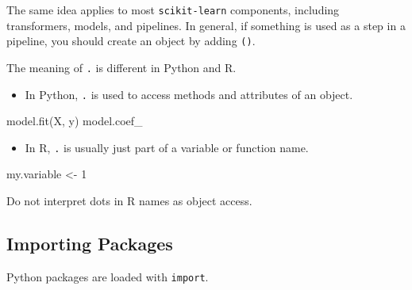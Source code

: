 \documentclass[
  letterpaper,
  DIV=11,
  numbers=noendperiod]{scrreprt}
\newenvironment{Shaded}{\begin{snugshade}}{\end{snugshade}}
\newcommand{\DecValTok}[1]{\textcolor[rgb]{0.68,0.00,0.00}{#1}}
\newcommand{\NormalTok}[1]{\textcolor[rgb]{0.00,0.23,0.31}{#1}}
\newcommand{\OtherTok}[1]{\textcolor[rgb]{0.00,0.23,0.31}{#1}}
\providecommand{\tightlist}{%
  \setlength{\itemsep}{0pt}\setlength{\parskip}{0pt}}
\theoremstyle{definition}
\theoremstyle{definition}
\theoremstyle{plain}
\theoremstyle{plain}
\theoremstyle{remark}
\begin{document}
The same idea applies to most \texttt{scikit-learn} components,
including transformers, models, and pipelines. In general, if something
is used as a step in a pipeline, you should create an object by adding
\texttt{()}.

\begin{tcolorbox}[enhanced jigsaw, arc=.35mm, bottomrule=.15mm, bottomtitle=1mm, breakable, colback=white, colbacktitle=quarto-callout-caution-color!10!white, colframe=quarto-callout-caution-color-frame, coltitle=black, left=2mm, leftrule=.75mm, opacityback=0, opacitybacktitle=0.6, rightrule=.15mm, title=\textcolor{quarto-callout-caution-color}{\faFire}\hspace{0.5em}{\texttt{.} (Dot)}, titlerule=0mm, toprule=.15mm, toptitle=1mm]

The meaning of \texttt{.} is different in Python and R.

\begin{itemize}
\tightlist
\item
  In Python, \texttt{.} is used to access methods and attributes of an
  object.
\end{itemize}

\begin{Shaded}
\begin{Highlighting}[]
\NormalTok{model.fit(X, y)}
\NormalTok{model.coef\_}
\end{Highlighting}
\end{Shaded}

\begin{itemize}
\tightlist
\item
  In R, \texttt{.} is usually just part of a variable or function name.
\end{itemize}

\begin{Shaded}
\begin{Highlighting}[]
\NormalTok{my.variable }\OtherTok{\textless{}{-}} \DecValTok{1}
\end{Highlighting}
\end{Shaded}

Do not interpret dots in R names as object access.

\end{tcolorbox}

\subsection{Importing Packages}\label{importing-packages}

Python packages are loaded with \texttt{import}.
\end{document}
